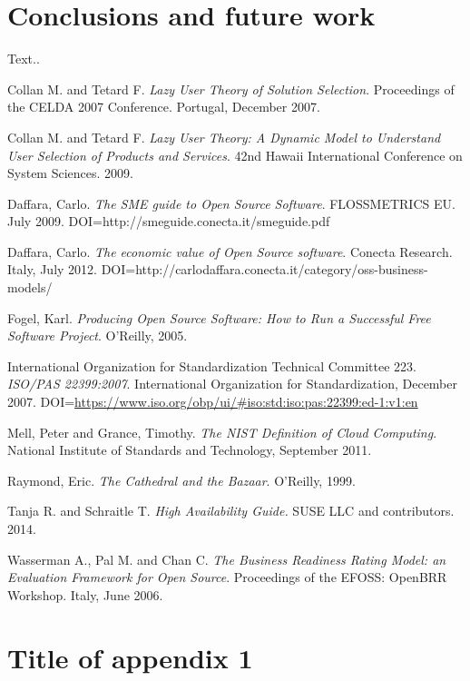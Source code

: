 \documentclass[a4paper, 12pt]{book}
\begin{document}
%
\chapter{Conclusions and future work}
\label{chap:conclusions}

Text..

%
\renewcommand{\bibname}{References}

\begin{thebibliography}{25}
  

   Collan M. and Tetard F. \textit{Lazy User Theory of Solution Selection}. Proceedings of the CELDA 2007 Conference. Portugal, December 2007.

   Collan M. and Tetard F. \textit{Lazy User Theory: A Dynamic Model to Understand User Selection of Products and Services}. 42nd Hawaii International Conference on System Sciences. 2009.

 Daffara, Carlo. \textit{The SME guide to Open Source Software}. FLOSSMETRICS EU. July 2009. DOI=http://smeguide.conecta.it/smeguide.pdf

   Daffara, Carlo. \textit{The economic value of Open Source software}. Conecta Research. Italy, July 2012. DOI=http://carlodaffara.conecta.it/category/oss-business-models/

   Fogel, Karl. \textit{Producing Open Source Software: How to Run a Successful Free Software Project}. O'Reilly, 2005.

   International Organization for Standardization Technical Committee 223. \textit{ISO/PAS 22399:2007}. International Organization for Standardization, December 2007. DOI=\url{https://www.iso.org/obp/ui/\#iso:std:iso:pas:22399:ed-1:v1:en}

   Mell, Peter and Grance, Timothy. \textit{The NIST Definition of Cloud Computing}. National Institute of Standards and Technology, September 2011.

   Raymond, Eric. \textit{The Cathedral and the Bazaar}. O'Reilly, 1999.

   Tanja R. and Schraitle T. \textit{High Availability Guide.} SUSE LLC and contributors. 2014.

   Wasserman A., Pal M. and Chan C. \textit{The Business Readiness Rating Model: an Evaluation Framework for Open Source}. Proceedings of the EFOSS: OpenBRR Workshop. Italy, June 2006.


\end{thebibliography}

%
\appendix
\chapter{Title of appendix 1}
\label{app:apendix1}
\end{document}
